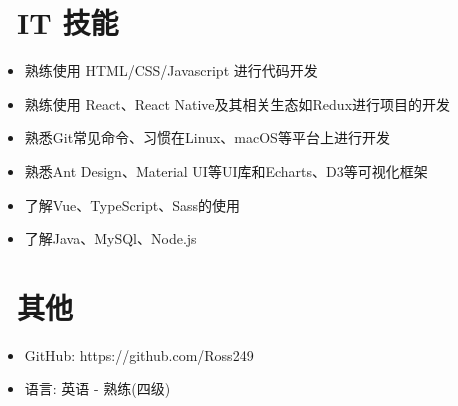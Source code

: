 \documentclass{resume}
\begin{document}

\section{\faCogs\ IT 技能}
\begin{itemize}[parsep=0.5ex]
  \item 熟练使⽤ HTML/CSS/Javascript 进⾏代码开发
  \item 熟练使用 React、React Native及其相关生态如Redux进行项目的开发
  \item 熟悉Git常见命令、习惯在Linux、macOS等平台上进行开发
  \item 熟悉Ant Design、Material UI等UI库和Echarts、D3等可视化框架
  \item 了解Vue、TypeScript、Sass的使用
  \item 了解Java、MySQl、Node.js
\end{itemize}


\section{\faInfo\ 其他}
\begin{itemize}[parsep=0.5ex]
  \item GitHub: https://github.com/Ross249
  \item 语言: 英语 - 熟练(四级)
\end{itemize}

%
%
\end{document}
